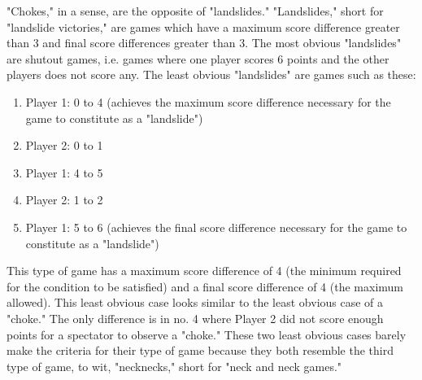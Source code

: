 \documentclass{article}
\begin{document}
"Chokes," in a sense, are the opposite of "landslides." "Landslides," short for "landslide victories," are games which have a maximum score difference greater than 3 and final score differences greater than 3. The most obvious "landslides" are shutout games, i.e. games where one player scores 6 points and the other players does not score any. The least obvious "landslides" are games such as these:
\begin{enumerate}
	\item Player 1: 0 to 4 (achieves the maximum score difference necessary for the game to constitute as a "landslide")
	\item Player 2: 0 to 1
	\item Player 1: 4 to 5
	\item Player 2: 1 to 2
	\item Player 1: 5 to 6 (achieves the final score difference necessary for the game to constitute as a "landslide")
\end{enumerate}
This type of game has a maximum score difference of 4 (the minimum required for the condition to be satisfied) and a final score difference of 4 (the maximum allowed). This least obvious case looks similar to the least obvious case of a "choke." The only difference is in no. 4 where Player 2 did not score enough points for a spectator to observe a "choke." These two least obvious cases barely make the criteria for their type of game because they both resemble the third type of game, to wit, "necknecks," short for "neck and neck games."
\end{document}
